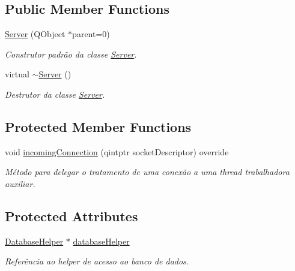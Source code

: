 \subsection*{Public Member Functions}
\begin{DoxyCompactItemize}
\item 
\hyperlink{classServer_a1950ac036d86af898428d7ba39bbf048}{Server} (Q\+Object $\ast$parent=0)
\begin{DoxyCompactList}\small\item\em Construtor padrão da classe \hyperlink{classServer}{Server}. \end{DoxyCompactList}\item 
virtual \hyperlink{classServer_a4b3aa2579cb1c8cd1d069582c14d0fa6}{$\sim$\+Server} ()
\begin{DoxyCompactList}\small\item\em Destrutor da classe \hyperlink{classServer}{Server}. \end{DoxyCompactList}\end{DoxyCompactItemize}
\subsection*{Protected Member Functions}
\begin{DoxyCompactItemize}
\item 
void \hyperlink{classServer_aa229a1587514197693274aa0d589344b}{incoming\+Connection} (qintptr socket\+Descriptor) override
\begin{DoxyCompactList}\small\item\em Método para delegar o tratamento de uma conexão a uma thread trabalhadora auxiliar. \end{DoxyCompactList}\end{DoxyCompactItemize}
\subsection*{Protected Attributes}
\begin{DoxyCompactItemize}
\item 
\hyperlink{classDatabaseHelper}{Database\+Helper} $\ast$ \hyperlink{classServer_a6dedbdbd06ad8f0682a3b825b054425f}{database\+Helper}\hypertarget{classServer_a6dedbdbd06ad8f0682a3b825b054425f}{}\label{classServer_a6dedbdbd06ad8f0682a3b825b054425f}

\begin{DoxyCompactList}\small\item\em Referência ao helper de acesso ao banco de dados. \end{DoxyCompactList}\end{DoxyCompactItemize}


